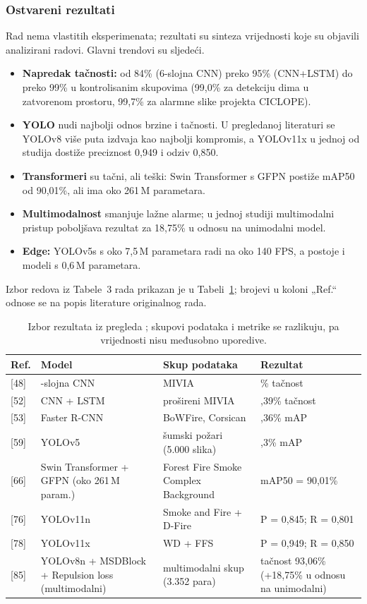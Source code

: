 \subsubsection{Ostvareni rezultati}
Rad nema vlastitih eksperimenata; rezultati su sinteza vrijednosti koje su objavili analizirani radovi. Glavni trendovi su sljedeći.
\begin{itemize}
  \item \textbf{Napredak tačnosti:} od 84\% (6-slojna CNN) preko 95\% (CNN+LSTM) do preko 99\% u kontrolisanim skupovima (99,0\% za detekciju dima u zatvorenom prostoru, 99,7\% za alarmne slike projekta CICLOPE).
  \item \textbf{YOLO} nudi najbolji odnos brzine i tačnosti. U pregledanoj literaturi se YOLOv8 više puta izdvaja kao najbolji kompromis, a YOLOv11x u jednoj od studija dostiže preciznost 0,949 i odziv 0,850.
  \item \textbf{Transformeri} su tačni, ali teški: Swin Transformer s GFPN postiže mAP50 od 90,01\%, ali ima oko 261\,M parametara.
  \item \textbf{Multimodalnost} smanjuje lažne alarme; u jednoj studiji multimodalni pristup poboljšava rezultat za 18,75\% u odnosu na unimodalni model.
  \item \textbf{Edge:} YOLOv5s s oko 7,5\,M parametara radi na oko 140 FPS, a postoje i modeli s 0,6\,M parametara.
\end{itemize}

Izbor redova iz Tabele~3 rada prikazan je u Tabeli~\ref{tab:elh}; brojevi u koloni „Ref.“ odnose se na popis literature originalnog rada.

\begin{table}[H]
\centering
\small
\begin{tabularx}{\linewidth}{@{}l>{\raggedright\arraybackslash}p{4.4cm}>{\raggedright\arraybackslash}X>{\raggedright\arraybackslash}p{3.6cm}@{}}
  \toprule
  \textbf{Ref.} & \textbf{Model} & \textbf{Skup podataka} & \textbf{Rezultat}\\
  \midrule
  {[48]} & 6-slojna CNN & MIVIA & 84\% tačnost\\
  {[52]} & CNN + LSTM & prošireni MIVIA & 95,39\% tačnost\\
  {[53]} & Faster R-CNN & BoWFire, Corsican & 93,36\% mAP\\
  {[59]} & YOLOv5 & šumski požari (5.000 slika) & 92,3\% mAP\\
  {[66]} & Swin Transformer + GFPN (oko 261\,M param.) & Forest Fire Smoke Complex Background & mAP50 = 90,01\%\\
  {[76]} & YOLOv11n & Smoke and Fire + D-Fire & P = 0,845; R = 0,801\\
  {[78]} & YOLOv11x & WD + FFS & P = 0,949; R = 0,850\\
  {[85]} & YOLOv8n + MSDBlock + Repulsion loss (multimodalni) & multimodalni skup (3.352 para) & tačnost 93,06\% (+18,75\% u odnosu na unimodalni)\\
  \bottomrule
\end{tabularx}
\caption{Izbor rezultata iz pregleda \cite{elhanashi}; skupovi podataka i metrike se razlikuju, pa vrijednosti nisu međusobno uporedive.}
\label{tab:elh}
\end{table}

